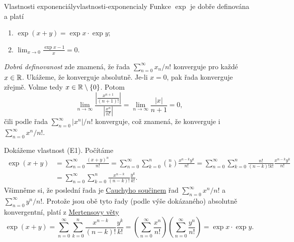 \begin{theorem}{Vlastnosti exponenciály}{vlastnosti-exponencialy}
 Funkce $\exp$ je dobře definována a platí
  \begin{enumerate}[label=(E\arabic*)]
   \item $\exp(x + y) = \exp x \cdot \exp y$;
   \item $\lim_{x \to 0} \frac{\exp x - 1}{x} = 0$.
  \end{enumerate}
\end{theorem}
\begin{thmproof}
 \emph{Dobrá definovanost} zde znamená, že řada $\sum_{n=0}^{\infty} x_n / n!$
 konverguje pro každé $x \in \mathbb{R}$. Ukážeme, že konverguje absolutně. Je-li $x =
 0$, pak řada konverguje zřejmě. Volme tedy $x \in \mathbb{R} \setminus \{0\}$. Potom
 \[
  \lim_{n \to \infty} \frac{\left| \frac{x^{n+1}}{(n+1)!} \right|}{\left|
  \frac{x^{n}}{n!} \right|} = \lim_{n \to \infty} \frac{|x|}{n+1} = 0,
 \]
 čili podle  řada
 $\sum_{n=0}^{\infty} |x^{n}|/n!$ konverguje, což znamená, že konverguje i
 $\sum_{n=0}^{\infty} x^{n}/n!$.

 Dokážeme vlastnost (E1). Počítáme
 \begin{align*}
  \exp(x+y) &= \sum_{n=0}^{\infty} \frac{(x+y)^{n}}{n!} = \sum_{n=0}^{\infty}
  \sum_{k=0}^n \binom{n}{k} \frac{x^{n-k}y^{k}}{n!} = \sum_{n=0}^{\infty}
  \sum_{k=0}^n \frac{n!}{(n-k)!k!} \frac{x^{n-k}y^{k}}{n!}\\
            &= \sum_{n=0}^{\infty} \sum_{k=0}^{n} \frac{x^{n-k}}{(n-k)!}
            \frac{y^{k}}{k!}.
 \end{align*}
 Všimněme si, že poslední řada je \hyperref[def:cauchyho-soucin-rad]{Cauchyho
 součinem} řad $\sum_{n=0}^{\infty} x^{n} / n!$ a $\sum_{n=0}^{\infty} y^{n} /
 n!$. Protože jsou obě tyto řady (podle výše dokázaného) absolutně konvergentní,
 platí z \hyperref[thm:mertensova]{Mertensovy věty}
 \[
  \exp(x+y) = \sum_{n=0}^{\infty} \sum_{k=0}^n
  \frac{x^{n-k}}{(n-k)!}\frac{y^{k}}{k!} = \left( \sum_{n=0}^{\infty}
  \frac{x^{n}}{n!} \right) \left( \sum_{n=0}^{\infty} \frac{y^{n}}{n!} \right) =
  \exp x \cdot \exp y.
 \]


\end{thmproof}
